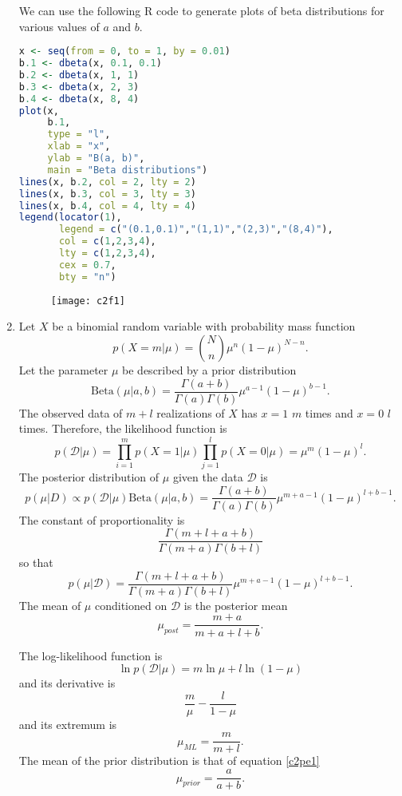 \begin{enumerate}
We can use the following R code to generate plots of beta distributions for various
values of $a$ and $b$.
\begin{lstlisting}[language=R, frame=single]
x <- seq(from = 0, to = 1, by = 0.01)
b.1 <- dbeta(x, 0.1, 0.1)
b.2 <- dbeta(x, 1, 1)
b.3 <- dbeta(x, 2, 3)
b.4 <- dbeta(x, 8, 4)
plot(x, 
     b.1, 
     type = "l", 
     xlab = "x", 
     ylab = "B(a, b)", 
     main = "Beta distributions")
lines(x, b.2, col = 2, lty = 2)
lines(x, b.3, col = 3, lty = 3)
lines(x, b.4, col = 4, lty = 4)
legend(locator(1), 
       legend = c("(0.1,0.1)","(1,1)","(2,3)","(8,4)"), 
       col = c(1,2,3,4), 
       lty = c(1,2,3,4), 
       cex = 0.7, 
       bty = "n")
\end{lstlisting}

\begin{figure}
\begin{center}
\texttt{[image: c2f1]}
\end{center}
\end{figure}

\item Let $X$ be a binomial random variable with probability mass function
\[
p(X = m|\mu) = \binom{N}{n}\mu^n (1 - \mu)^{N-n}.
\]
Let the parameter $\mu$ be described by a prior distribution
\begin{equation}\label{c2pe1}
\mathrm{Beta}(\mu|a, b) = \frac{\Gamma(a + b)}{\Gamma(a)\Gamma(b)}\mu^{a-1}(1 - \mu)^{b-1}.
\end{equation}
The observed data of $m + l$ realizations of $X$ has $x = 1$ $m$ times and $x = 0$ $l$ times.
Therefore, the likelihood function is
\[
p(\mathcal{D}|\mu) = \prod_{i=1}^{m}p(X=1|\mu)\prod_{j=1}^lp(X=0|\mu) = \mu^m(1 - \mu)^l.
\]
The posterior distribution of $\mu$ given the data $\mathcal{D}$ is
\[
p(\mu|D) \propto p(\mathcal{D}|\mu)\mathrm{Beta}(\mu|a, b) = \frac{\Gamma(a+b)}{\Gamma(a)\Gamma(b)}\mu^{m+a-1}(1-\mu)^{l+b-1}.
\]
The constant of proportionality is
\[
\frac{\Gamma(m+l+a+b)}{\Gamma(m+a)\Gamma(b+l)}
\]
so that
\[
p(\mu|\mathcal{D}) = \frac{\Gamma(m+l+a+b)}{\Gamma(m+a)\Gamma(b+l)}\mu^{m+a-1}(1-\mu)^{l+b-1}.
\]
The mean of $\mu$ conditioned on $\mathcal{D}$ is the posterior mean
\begin{equation}\label{c2pe2}
\mu_{post} = \frac{m+a}{m+a+l+b}.
\end{equation}

The log-likelihood function is
\[
\ln p(\mathcal{D}|\mu) = m\ln\mu + l\ln(1 - \mu)
\]
and its derivative is
\[
\frac{m}{\mu} - \frac{l}{1 - \mu}
\]
and its extremum is 
\begin{equation}\label{c2pe3}
\mu_{ML} = \frac{m}{m+l}.
\end{equation}
The mean of the prior distribution is that of equation \eqref{c2pe1}
\begin{equation}\label{c2pe4}
\mu_{prior} = \frac{a}{a+b}.
\end{equation}


\end{enumerate}
